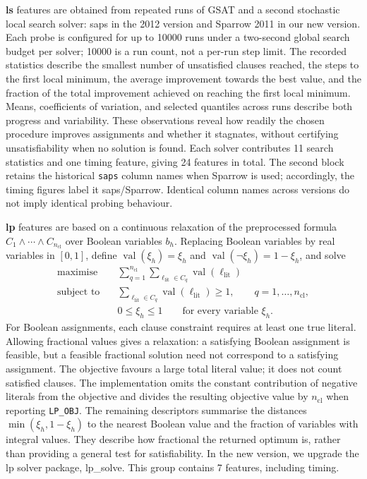 \noindent\textbf{\Gls{ls}} features are obtained from repeated runs of GSAT and a second stochastic local search solver: \gls{saps} in the 2012 version and Sparrow 2011 in our new version. Each probe is configured for up to 10000 runs under a two-second global search budget per solver; 10000 is a run count, not a per-run step limit. The recorded statistics describe the smallest number of unsatisfied clauses reached, the steps to the first local minimum, the average improvement towards the best value, and the fraction of the total improvement achieved on reaching the first local minimum. Means, coefficients of variation, and selected quantiles across runs describe both progress and variability. These observations reveal how readily the chosen procedure improves assignments and whether it stagnates, without certifying unsatisfiability when no solution is found. Each solver contributes 11 search statistics and one timing feature, giving 24 features in total. The second block retains the historical \texttt{saps} column names when Sparrow is used; accordingly, the timing figures label it \gls{saps}/Sparrow. Identical column names across versions do not imply identical probing behaviour.

\noindent\textbf{\Gls{lp}} features are based on a continuous relaxation of the preprocessed formula $C_1\land\cdots\land C_{n_{\mathrm{cl}}}$ over Boolean variables $b_h$. Replacing Boolean variables by real variables in $[0,1]$, define $\operatorname{val}(\xi_h)=\xi_h$ and $\operatorname{val}(\neg \xi_h)=1-\xi_h$, and solve
\begin{equation*}
    \begin{aligned}
        \text{maximise}\quad & \sum_{q=1}^{n_{\mathrm{cl}}}\sum_{\ell_{\mathrm{lit}}\in C_q}\operatorname{val}(\ell_{\mathrm{lit}}) \\
        \text{subject to}\quad & \sum_{\ell_{\mathrm{lit}}\in C_q}\operatorname{val}(\ell_{\mathrm{lit}})\geq 1, \qquad q=1,\ldots,n_{\mathrm{cl}}, \\
        & 0\leq \xi_h\leq 1 \qquad\text{for every variable }\xi_h.
    \end{aligned}
\end{equation*}
For Boolean assignments, each clause constraint requires at least one true literal. Allowing fractional values gives a relaxation: a satisfying Boolean assignment is feasible, but a feasible fractional solution need not correspond to a satisfying assignment. The objective favours a large total literal value; it does not count satisfied clauses. The implementation omits the constant contribution of negative literals from the objective and divides the resulting objective value by $n_{\mathrm{cl}}$ when reporting \texttt{LP\_OBJ}. The remaining descriptors summarise the distances $\min(\xi_h,1-\xi_h)$ to the nearest Boolean value and the fraction of variables with integral values. They describe how fractional the returned optimum is, rather than providing a general test for satisfiability. In the new version, we upgrade the \gls{lp} solver package, lp\_solve. This group contains 7 features, including timing.

